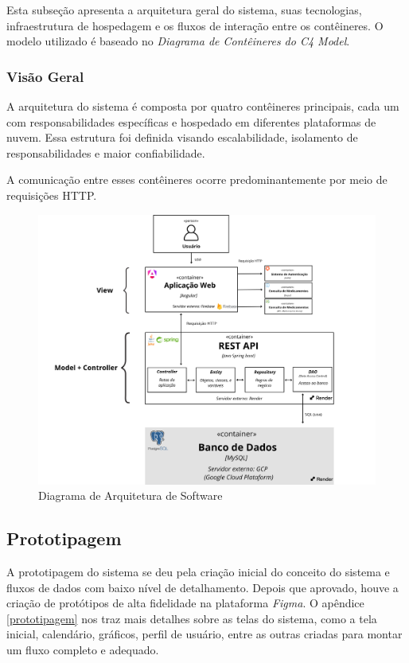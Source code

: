 \documentclass[
	article,			%
	12pt,				%
	oneside,			%
	a4paper,			%
    BIBLATEX,           %
	english,			%
	brazil,				%
	sumario=tradicional
	]{abntex2}
\begin{document}
Esta subseção apresenta a arquitetura geral do sistema, suas tecnologias, infraestrutura de hospedagem e os fluxos de interação entre os contêineres. O modelo utilizado é baseado no \textit{Diagrama de Contêineres do C4 Model}.

\subsubsection{Visão Geral}

A arquitetura do sistema é composta por quatro contêineres principais, cada um com responsabilidades específicas e hospedado em diferentes plataformas de nuvem. Essa estrutura foi definida visando escalabilidade, isolamento de responsabilidades e maior confiabilidade.

A comunicação entre esses contêineres ocorre predominantemente por meio de requisições HTTP.

\begin{figure}[!htbp]
    \centering
    \includegraphics[width=1\textwidth]{assets/figuras/diagrama_de_software.png}
    \caption{Diagrama de Arquitetura de Software}
    \label{fig:diagrama_software}
\end{figure}

\newpage

\subsection{Prototipagem}

A prototipagem do sistema se deu pela criação inicial do conceito do sistema e fluxos de dados com baixo nível de detalhamento. Depois que aprovado, houve a criação de protótipos de alta fidelidade na plataforma \textit{Figma}. O apêndice \autoref{prototipagem} nos traz mais detalhes sobre as telas do sistema, como a tela inicial, calendário, gráficos, perfil de usuário, entre as outras criadas para montar um fluxo completo e adequado.
\end{document}
